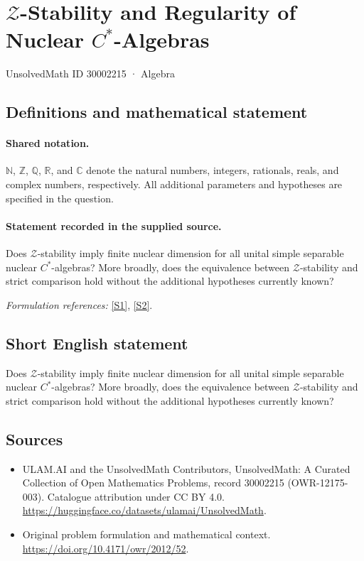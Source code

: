 \documentclass[11pt]{article}
\newcommand{\sref}[2]{\hyperlink{source:#1:#2}{[S#2]}}
\begin{document}
\setcounter{section}{30002214}
\section{\texorpdfstring{$\mathcal Z$-Stability and Regularity of Nuclear $C^*$-Algebras}{mathcal Z-Stability and Regularity of Nuclear C\textasciicircum{}*-Algebras}}\label{30002215}
{\small UnsolvedMath ID 30002215 · Algebra}
\subsection{Definitions and mathematical statement}

\paragraph{Shared notation.}$\mathbb N$, $\mathbb Z$, $\mathbb Q$, $\mathbb R$, and $\mathbb C$ denote the natural numbers, integers, rationals, reals, and complex numbers, respectively. All additional parameters and hypotheses are specified in the question.


\paragraph{Statement recorded in the supplied source.}
Does $\mathcal Z$-stability imply finite nuclear dimension for all unital simple separable nuclear $C^*$-algebras? More broadly, does the equivalence between $\mathcal Z$-stability and strict comparison hold without the additional hypotheses currently known?
\par\smallskip\textit{Formulation references:} \sref{30002215}{1}, \sref{30002215}{2}.
\subsection{Short English statement}
Does $\mathcal Z$-stability imply finite nuclear dimension for all unital simple separable nuclear $C^*$-algebras? More broadly, does the equivalence between $\mathcal Z$-stability and strict comparison hold without the additional hypotheses currently known?
\subsection{Sources}
\begin{itemize}
\item[\hypertarget{source:30002215:1}{S1}] ULAM.AI and the UnsolvedMath Contributors, UnsolvedMath: A Curated Collection of Open Mathematics Problems, record 30002215 (OWR-12175-003). Catalogue attribution under CC BY 4.0.
\url{https://huggingface.co/datasets/ulamai/UnsolvedMath}.
\item[\hypertarget{source:30002215:2}{S2}] Original problem formulation and mathematical context.
\url{https://doi.org/10.4171/owr/2012/52}.
\end{itemize}
\label{end:30002215}
\end{document}
